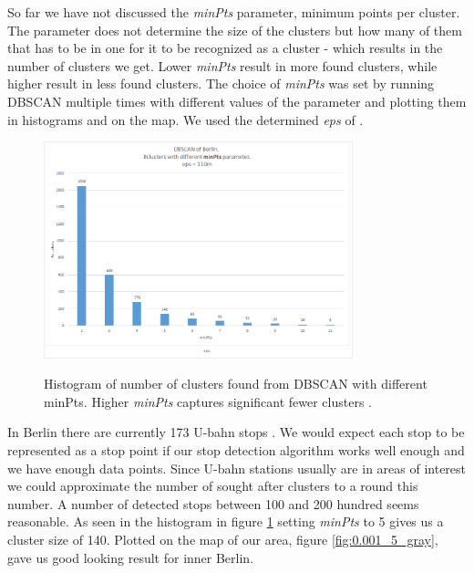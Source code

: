 So far we have not discussed the \textit{minPts} parameter, minimum points per cluster. The parameter does not determine the size of the clusters but how many of them that has to be in one for it to be recognized as a cluster - which results in the number of clusters we get. Lower \textit{minPts} result in more found clusters, while higher result in less found clusters. The choice of \textit{minPts} was set by running DBSCAN multiple times with different values of the parameter and plotting them in histograms and on the map. We used the determined \textit{eps} of . 
\begin{figure}[!ht]
	\centering
	\includegraphics[width=0.8\textwidth]{images/histogram_minPts}\\
	\caption{ Histogram of number of clusters found from DBSCAN with different minPts. Higher \textit{minPts} captures significant fewer clusters . }
	\label{fig:histogram_minPts}
\end{figure}
In Berlin there are currently 173 U-bahn stops \cite{sbahn}. We would expect each stop to be represented as a stop point if our stop detection algorithm works well enough and we have enough data points. Since U-bahn stations usually are in areas of interest we could approximate the number of sought after clusters to a round this number. A number of detected stops between 100 and 200 hundred seems reasonable. As seen in the histogram in figure \ref{fig:histogram_minPts} setting \textit{minPts} to 5 gives us a cluster size of 140. Plotted on the map of our area, figure \ref{fig:0.001_5_gray}, gave us good looking result for inner Berlin. 


